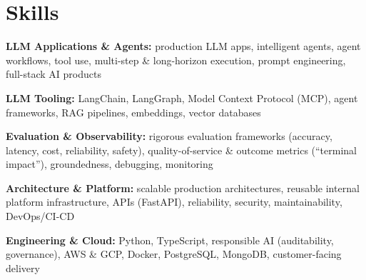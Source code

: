 \documentclass[10pt,a4paper]{article}
\begin{document}
\section{Skills}
\begin{tight}
  \item[\textcolor{accent}{\small$\bullet$}] \textbf{LLM Applications \& Agents:} production LLM apps, intelligent agents, agent workflows, tool use, multi-step \& long-horizon execution, prompt engineering, full-stack AI products
  \item[\textcolor{accent}{\small$\bullet$}] \textbf{LLM Tooling:} LangChain, LangGraph, Model Context Protocol (MCP), agent frameworks, RAG pipelines, embeddings, vector databases
  \item[\textcolor{accent}{\small$\bullet$}] \textbf{Evaluation \& Observability:} rigorous evaluation frameworks (accuracy, latency, cost, reliability, safety), quality-of-service \& outcome metrics (``terminal impact''), groundedness, debugging, monitoring
  \item[\textcolor{accent}{\small$\bullet$}] \textbf{Architecture \& Platform:} scalable production architectures, reusable internal platform infrastructure, APIs (FastAPI), reliability, security, maintainability, DevOps/CI-CD
  \item[\textcolor{accent}{\small$\bullet$}] \textbf{Engineering \& Cloud:} Python, TypeScript, responsible AI (auditability, governance), AWS \& GCP, Docker, PostgreSQL, MongoDB, customer-facing delivery
\end{tight}

\end{document}
